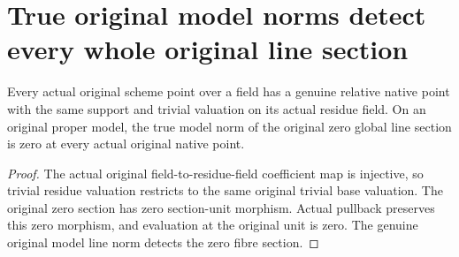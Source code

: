\section{True original model norms detect every whole original line section}
\label{sec:scheme-global-section-norm-detection}

\begin{theorem}
\label{thm:scheme-original-trivial-points-section-norm}
\leanok
{}
Every actual original scheme point over a field has a genuine relative native
point with the same support and trivial valuation on its actual residue field.
On an original proper model, the true model norm of the original zero global
line section is zero at every actual original native point.
\end{theorem}
\begin{proof}
The actual original field-to-residue-field coefficient map is injective, so
trivial residue valuation restricts to the same original trivial base valuation.
The original zero section has zero section-unit morphism. Actual pullback
preserves this zero morphism, and evaluation at the original unit is zero.
The genuine original model line norm detects the zero fibre section.
\end{proof}

